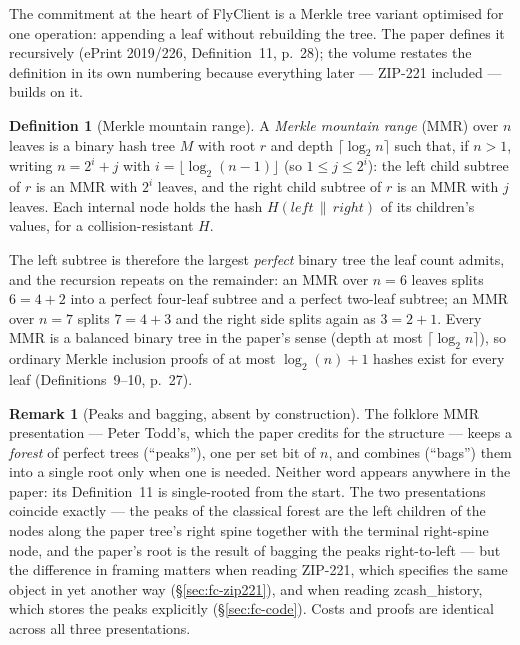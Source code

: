 \documentclass[11pt,a4paper]{article}
\theoremstyle{definition}
\newtheorem{definition}[theorem]{Definition}
\newtheorem{remark}[theorem]{Remark}
\begin{document}
The commitment at the heart of FlyClient is a Merkle tree variant optimised
for one operation: appending a leaf without rebuilding the tree. The paper
defines it recursively (ePrint 2019/226, Definition~11, p.~28); the volume
restates the definition in its own numbering because everything later ---
ZIP-221 included --- builds on it.

\begin{definition}[Merkle mountain range]\label{def:fc-mmr}
A \emph{Merkle mountain range} (MMR) over $n$ leaves is a binary hash tree
$M$ with root $r$ and depth $\lceil \log_2 n \rceil$ such that, if $n > 1$,
writing $n = 2^i + j$ with $i = \lfloor \log_2 (n-1) \rfloor$ (so
$1 \le j \le 2^i$): the left child subtree of $r$ is an MMR with $2^i$
leaves, and the right child subtree of $r$ is an MMR with $j$ leaves. Each
internal node holds the hash $H(\mathit{left} \,\|\, \mathit{right})$ of its
children's values, for a collision-resistant $H$.
\end{definition}

The left subtree is therefore the largest \emph{perfect} binary tree the
leaf count admits, and the recursion repeats on the remainder: an MMR over
$n = 6$ leaves splits $6 = 4 + 2$ into a perfect four-leaf subtree and a
perfect two-leaf subtree; an MMR over $n = 7$ splits $7 = 4 + 3$ and the
right side splits again as $3 = 2 + 1$. Every MMR is a balanced binary tree
in the paper's sense (depth at most $\lceil \log_2 n \rceil$), so ordinary
Merkle inclusion proofs of at most $\log_2(n) + 1$ hashes exist for every
leaf (Definitions~9--10, p.~27).

\begin{remark}[Peaks and bagging, absent by construction]
\label{rem:fc-peaks}
The folklore MMR presentation --- Peter Todd's, which the paper credits for
the structure --- keeps a \emph{forest} of perfect trees (``peaks''), one
per set bit of $n$, and combines (``bags'') them into a single root only
when one is needed. Neither word appears anywhere in the paper: its
Definition~11 is single-rooted from the start. The two presentations
coincide exactly --- the peaks of the classical forest are the left children
of the nodes along the paper tree's right spine together with the terminal
right-spine node, and the paper's root is the result of bagging the peaks
right-to-left --- but the difference in
framing matters when reading ZIP-221, which specifies the same object in
yet another way (\S\ref{sec:fc-zip221}), and when reading
\textsf{zcash\_history}, which stores the peaks explicitly
(\S\ref{sec:fc-code}). Costs and proofs are identical across all three
presentations.
\end{remark}
\end{document}
